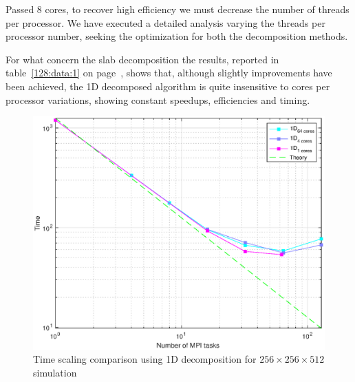 \par
Passed 8 cores, to recover high efficiency we must decrease the number of threads per processor. We have executed a detailed analysis varying the threads per processor number, seeking the optimization for both the decomposition methods.
\par
For what concern the slab decomposition the results, reported in table~\ref{128:data:1} on page~\pageref{128:data:1}, shows that, although slightly improvements have been achieved, the 1D decomposed algorithm is quite insensitive to cores per processor variations, showing constant speedups, efficiencies and timing.
\par 
\begin{figure}
\begin{center}
\includegraphics[scale=0.55]{grafici/1284}
\caption{Time scaling comparison using 1D decomposition for $256\times 256\times 512$  simulation}
\label{1284}
\end{center}
\end{figure}
